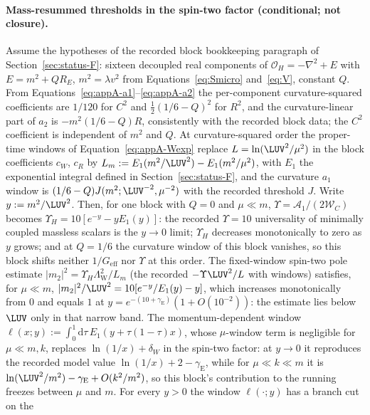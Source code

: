 \paragraph{Mass-resummed thresholds in the spin-two factor
(conditional; not closure).}
Assume the hypotheses of the recorded block bookkeeping paragraph of
Section~\ref{sec:status-F}: sixteen decoupled real components of
\(\mathcal O_H=-\nabla^2+E\) with \(E=m^2+Q R_E\),
\(m^2=\lambda v^2\) from Equations~\eqref{eq:Smicro} and~\eqref{eq:V},
constant \(Q\). From Equations~\eqref{eq:appA-a1}--\eqref{eq:appA-a2}
the per-component curvature-squared coefficients are \(1/120\) for
\(C^2\) and \(\tfrac12(1/6-Q)^2\) for \(R^2\), and the
curvature-linear part of \(a_2\) is \(-m^2(1/6-Q)R\), consistently
with the recorded block data; the \(C^2\) coefficient is independent
of \(m^2\) and \(Q\). At curvature-squared order the
proper-time windows of Equation~\eqref{eq:appA-Wexp} replace
\(L=\ln(\LUV^2/\mu^2)\) in the block coefficients \(c_W\), \(c_R\) by
\(L_m:=E_1(m^2/\LUV^2)-E_1(m^2/\mu^2)\), with \(E_1\) the
exponential integral defined in Section~\ref{sec:status-F}, and the
curvature \(a_1\) window is \((1/6-Q)J(m^2;\LUV^{-2},\mu^{-2})\) with
the recorded threshold \(J\). Write \(y:=m^2/\LUV^2\). Then, for one
block with \(Q=0\) and \(\mu\ll m\),
\(\Upsilon=\mathcal A_1/(2\mathcal W_C)\) becomes
\(\Upsilon_H=10[e^{-y}-yE_1(y)]\): the recorded \(\Upsilon=10\)
universality of minimally coupled massless scalars is the \(y\to0\)
limit; \(\Upsilon_H\) decreases monotonically to zero as \(y\) grows;
and at \(Q=1/6\) the curvature window of this block vanishes, so this
block shifts neither \(1/G_{\mathrm{eff}}\) nor \(\Upsilon\) at this
order. The fixed-window spin-two pole estimate
\(|m_2|^2=\Upsilon_H\Lambda^2_{\mathrm W}/L_m\) (the recorded
\(-\Upsilon\LUV^2/L\) with windows) satisfies, for \(\mu\ll m\),
\(|m_2|^2/\LUV^2=10[e^{-y}/E_1(y)-y]\), which increases
monotonically from \(0\) and equals \(1\) at
\(y=e^{-(10+\gamma_{\mathrm E})}(1+O(10^{-2}))\): the estimate lies
below \(\LUV\) only in that narrow band. The momentum-dependent
window \(\ell(x;y):=\int_0^1\mathrm{d}\tau\,
E_1(y+\tau(1-\tau)x)\), whose \(\mu\)-window term is negligible for
\(\mu\ll m,k\), replaces \(\ln(1/x)+\delta_W\) in the spin-two
factor: at \(y\to0\) it reproduces the recorded model value
\(\ln(1/x)+2-\gamma_{\mathrm E}\), while for \(\mu\ll k\ll m\) it is
\(\ln(\LUV^2/m^2)-\gamma_{\mathrm E}+O(k^2/m^2)\), so this block's
contribution to the running freezes between \(\mu\) and \(m\). For
every \(y>0\) the window \(\ell(\cdot;y)\) has a branch cut on the
